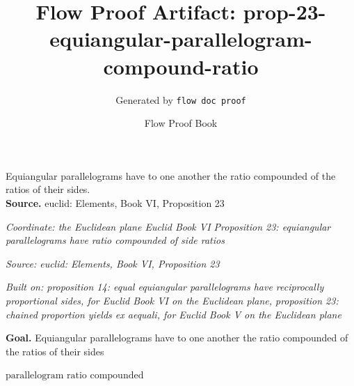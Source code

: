 \documentclass[11pt]{article}
\title{Flow Proof Artifact: prop-23-equiangular-parallelogram-compound-ratio}
\author{Generated by \texttt{flow doc proof}}
\date{Flow Proof Book}
\theoremstyle{definition}
\begin{document}
\maketitle
Equiangular parallelograms have to one another the ratio compounded of the ratios of their sides.\\[0.5em]
\textbf{Source.} euclid: Elements, Book VI, Proposition 23\\[0.5em]
\bigskip
{}\par
\smallskip\noindent\textit{Coordinate: the Euclidean plane \cdot Euclid Book VI \cdot Proposition 23: equiangular parallelograms have ratio compounded of side ratios}\par
\smallskip\noindent\textit{Source: euclid: Elements, Book VI, Proposition 23}\par
\smallskip\noindent\textit{Built on: proposition 14: equal equiangular parallelograms have reciprocally proportional sides, for Euclid Book VI on the Euclidean plane, proposition 23: chained proportion yields ex aequali, for Euclid Book V on the Euclidean plane}\par
\medskip
\noindent\textbf{Goal.} Equiangular parallelograms have to one another the ratio compounded of the ratios of their sides\par
\noindent$\displaystyle \text{parallelogram ratio compounded}$\par
\medskip
\noindent
\end{document}
